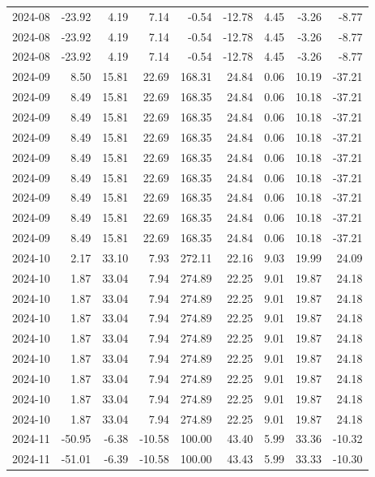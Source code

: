 \begin{table}[ht]
\begin{tabular}{lrrrrrrrr}
  2024-08 & -23.92 & 4.19 & 7.14 & -0.54 & -12.78 & 4.45 & -3.26 & -8.77 \\ 
  2024-08 & -23.92 & 4.19 & 7.14 & -0.54 & -12.78 & 4.45 & -3.26 & -8.77 \\ 
  2024-08 & -23.92 & 4.19 & 7.14 & -0.54 & -12.78 & 4.45 & -3.26 & -8.77 \\ 
  2024-09 & 8.50 & 15.81 & 22.69 & 168.31 & 24.84 & 0.06 & 10.19 & -37.21 \\ 
  2024-09 & 8.49 & 15.81 & 22.69 & 168.35 & 24.84 & 0.06 & 10.18 & -37.21 \\ 
  2024-09 & 8.49 & 15.81 & 22.69 & 168.35 & 24.84 & 0.06 & 10.18 & -37.21 \\ 
  2024-09 & 8.49 & 15.81 & 22.69 & 168.35 & 24.84 & 0.06 & 10.18 & -37.21 \\ 
  2024-09 & 8.49 & 15.81 & 22.69 & 168.35 & 24.84 & 0.06 & 10.18 & -37.21 \\ 
  2024-09 & 8.49 & 15.81 & 22.69 & 168.35 & 24.84 & 0.06 & 10.18 & -37.21 \\ 
  2024-09 & 8.49 & 15.81 & 22.69 & 168.35 & 24.84 & 0.06 & 10.18 & -37.21 \\ 
  2024-09 & 8.49 & 15.81 & 22.69 & 168.35 & 24.84 & 0.06 & 10.18 & -37.21 \\ 
  2024-09 & 8.49 & 15.81 & 22.69 & 168.35 & 24.84 & 0.06 & 10.18 & -37.21 \\ 
  2024-10 & 2.17 & 33.10 & 7.93 & 272.11 & 22.16 & 9.03 & 19.99 & 24.09 \\ 
  2024-10 & 1.87 & 33.04 & 7.94 & 274.89 & 22.25 & 9.01 & 19.87 & 24.18 \\ 
  2024-10 & 1.87 & 33.04 & 7.94 & 274.89 & 22.25 & 9.01 & 19.87 & 24.18 \\ 
  2024-10 & 1.87 & 33.04 & 7.94 & 274.89 & 22.25 & 9.01 & 19.87 & 24.18 \\ 
  2024-10 & 1.87 & 33.04 & 7.94 & 274.89 & 22.25 & 9.01 & 19.87 & 24.18 \\ 
  2024-10 & 1.87 & 33.04 & 7.94 & 274.89 & 22.25 & 9.01 & 19.87 & 24.18 \\ 
  2024-10 & 1.87 & 33.04 & 7.94 & 274.89 & 22.25 & 9.01 & 19.87 & 24.18 \\ 
  2024-10 & 1.87 & 33.04 & 7.94 & 274.89 & 22.25 & 9.01 & 19.87 & 24.18 \\ 
  2024-10 & 1.87 & 33.04 & 7.94 & 274.89 & 22.25 & 9.01 & 19.87 & 24.18 \\ 
  2024-11 & -50.95 & -6.38 & -10.58 & 100.00 & 43.40 & 5.99 & 33.36 & -10.32 \\ 
  2024-11 & -51.01 & -6.39 & -10.58 & 100.00 & 43.43 & 5.99 & 33.33 & -10.30 \\ 

\end{tabular}
\end{table}
